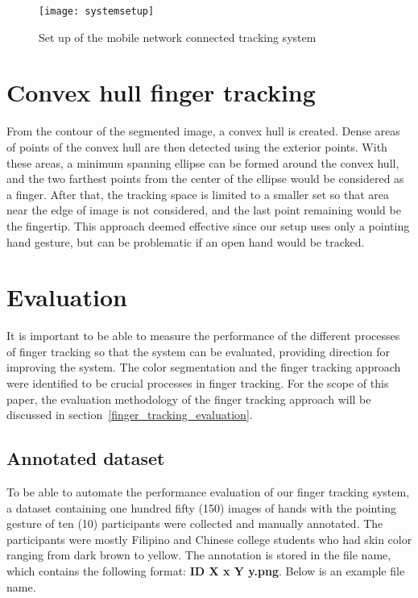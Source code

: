 \documentclass{acm_proc_article-sp}
\begin{document}
\begin{figure}[!ht]
\centering
\texttt{[image: systemsetup]}
\caption{Set up of the mobile network connected tracking system}
\label{fig:draftsetup}
\end{figure}

\section{Convex hull finger tracking}


From the contour of the segmented image, a convex hull is created. Dense areas of points of the convex hull are then detected using the exterior points. With these areas, a minimum spanning ellipse can be formed around the convex hull, and the two farthest points from the center of the ellipse would be considered as a finger. After that, the tracking space is limited to a smaller set so that area near the edge of image is not considered, and the last point remaining would be the fingertip. This approach deemed effective since our setup uses only a pointing hand gesture, but can be problematic if an open hand would be tracked.

\section{Evaluation}

It is important to be able to measure the performance of the different processes of finger tracking so that the system can be evaluated, providing direction for improving the system. The color segmentation and the finger tracking approach were identified to be crucial processes in finger tracking. For the scope of this paper, the evaluation methodology of the finger tracking approach will be discussed in section~\ref{finger_tracking_evaluation}.


\subsection{Annotated dataset}
To be able to automate the performance evaluation of our finger tracking system, a dataset containing one hundred fifty (150) images of hands with the pointing gesture of ten (10) participants were collected and manually annotated. The participants were mostly Filipino and Chinese college students who had skin color ranging from dark brown to yellow. The annotation is stored in the file name, which contains the following format: \textbf{ID X x Y y.png}. Below is an example file name.
\end{document}
